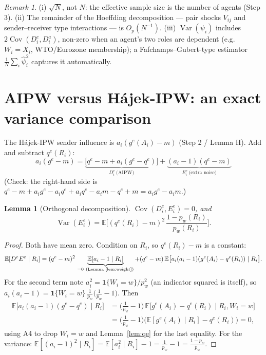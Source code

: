 \documentclass[11pt,a4paper]{article}
\newtheorem{lemma}{Lemma}
\theoremstyle{remark}
\newtheorem*{remark}{Remark}
\newcommand{\E}{\mathbb{E}}
\newcommand{\Var}{\operatorname{Var}}
\newcommand{\Cov}{\operatorname{Cov}}
\newcommand{\1}{\mathbf{1}}
\newcommand{\qe}{q^{e}}
\newcommand{\gE}{g^{e}}
\begin{document}
\begin{remark}
(i) $\sqrt N$, not $N$: the effective sample size is the number of agents (Step 3). (ii) The remainder of the Hoeffding decomposition --- pair shocks $V_{ij}$ and sender--receiver type interactions --- is $O_p(N^{-1})$. (iii) $\Var(\psi_i)$ includes $2\Cov(D^e_i,D^a_i)$, non-zero when an agent's two roles are dependent (e.g.\ $W_i=X_i$, WTO/Eurozone membership); a Fafchamps--Gubert-type estimator $\frac1N\sum_i\hat\psi_i^2$ captures it automatically.
\end{remark}

\section{AIPW versus Hájek-IPW: an exact variance comparison}

The Hájek-IPW sender influence is $a_i(\gE(A_i)-m)$ (Step 2 / Lemma H). Add and subtract $\qe(R_i)$:
\[
\boxed{\;a_i(\gE-m)=\underbrace{\big[\qe-m+a_i(\gE-\qe)\big]}_{D^e_i\ \text{(AIPW)}}+\underbrace{(a_i-1)(\qe-m)}_{E^e_i\ \text{(extra noise)}}\;}
\]
(Check: the right-hand side is $\qe-m+a_i\gE-a_i\qe+a_i\qe-a_im-\qe+m=a_i\gE-a_im$.)

\begin{lemma}[Orthogonal decomposition]\label{lem:orthdec}
$\Cov(D^e_i,E^e_i)=0$, and
\[
\Var(E^e_i)=\E\Big[(\qe(R_i)-m)^2\,\frac{1-p_w(R_i)}{p_w(R_i)}\Big].
\]
\end{lemma}

\begin{proof}
Both have mean zero. Condition on $R_i$, so $\qe(R_i)-m$ is a constant:
\[
\E[D^eE^e\mid R_i]=(\qe-m)^2\,\underbrace{\E[a_i-1\mid R_i]}_{=0\ \text{(Lemma \ref{lem:weight})}}
+(\qe-m)\,\E\big[a_i(a_i-1)(\gE(A_i)-\qe(R_i))\mid R_i\big].
\]
For the second term note $a_i^2=\1\{W_i=w\}/p_w^2$ (an indicator squared is itself), so $a_i(a_i-1)=\1\{W_i=w\}\,\frac{1}{p_w}\big(\frac1{p_w}-1\big)$. Then
\[
\begin{aligned}
\E\big[a_i(a_i-1)(\gE-\qe)\mid R_i\big]&=\Big(\tfrac1{p_w}-1\Big)\,\E\big[\gE(A_i)-\qe(R_i)\mid R_i,W_i=w\big]\\
&=\Big(\tfrac1{p_w}-1\Big)\big(\E[\gE(A_i)\mid R_i]-\qe(R_i)\big)=0,
\end{aligned}
\]
using A4 to drop $W_i=w$ and Lemma~\ref{lem:qe} for the last equality. For the variance:
$\E[(a_i-1)^2\mid R_i]=\E[a_i^2\mid R_i]-1=\frac1{p_w}-1=\frac{1-p_w}{p_w}$.
\end{proof}
\end{document}
